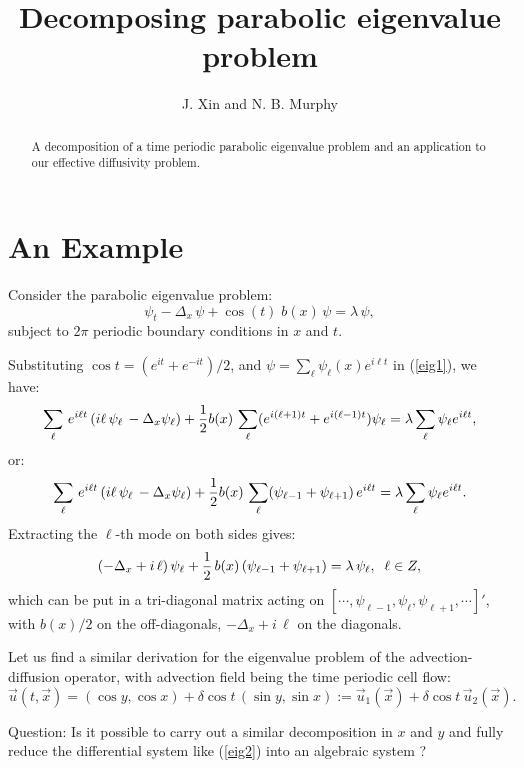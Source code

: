 \documentclass{article}
\newcommand{\no}{\nonumber}
\newcommand{\be}{\begin{equation}}
\newcommand{\ee}{\end{equation}}
\newcommand{\lam}{\mbox{$\lambda$}}
\newcommand{\0}{\mathbf{0}}
\newcommand{\1}{\mathbf{1}}
\newcommand{\2}{\mathbf{2}}
\newcommand{\3}{\mathbf{3}}
\newcommand{\4}{\mathbf{4}}
\newcommand{\5}{\mathbf{5}}
\newcommand{\6}{\mathbf{6}}
\newcommand{\7}{\mathbf{7}}
\newcommand{\8}{\mathbf{8}}
\begin{document}
\title{Decomposing parabolic eigenvalue problem}
\author{J. Xin and N. B. Murphy }
\date{}
\maketitle
\begin{abstract}
A decomposition of a time periodic parabolic eigenvalue problem and an
application to our effective diffusivity problem.

\end{abstract}
\bigskip
 
\section{An Example}
Consider the parabolic eigenvalue problem:
\be
\psi_t -\Delta_x \, \psi + \cos (t) \; b(x) \, \psi = \lam \, \psi, \label{eig1}
\ee
subject to $2\pi$ periodic boundary conditions in $x$ and $t$. 
\medskip

Substituting $\cos t = (e^{it} + e^{-it})/2$, and $\psi = \sum_{\ell} \psi_\ell (x) e^{i \ell t}$ in (\ref{eig1}), 
we have:
\be
\sum_\ell \,e^{i\ell t}\, (i \ell \, \psi_\ell\, - \Delta_x \psi_\ell) + {1\over 2} b(x)\, \sum_{\ell} (e^{i(\ell+1)t} + e^{i(\ell-1) t}) \psi_\ell 
= \lam \sum_\ell \psi_\ell e^{i\ell t}, \no
\ee
or:
\be
 \sum_\ell \,e^{i\ell t}\, (i \ell \, \psi_\ell\, - \Delta_x \psi_\ell)  + {1\over 2} b(x)\, \sum_{\ell} (\psi_{\ell-1} + \psi_{\ell+1}) \, e^{i\ell t} 
= \lam \sum_\ell \psi_\ell e^{i\ell t}. \no
\ee
Extracting the $\ell$-th mode on both sides gives:
\be
(-\Delta_x + i\, \ell)\, \psi_\ell +{1\over 2} \, b(x)\, (\psi_{\ell-1} + \psi_{\ell+1}) = \lam \, \psi_\ell, \;\; \ell \in Z, \label{eig2}
\ee
which can be put in a tri-diagonal matrix acting on $[\cdots, \psi_{\ell-1}, \psi_\ell, \psi_{\ell+1}, \cdots ]'$,
  with $b(x)/2$ on the off-diagonals, 
$-\Delta_x + i\, \ell $ on the diagonals.

Let us find a similar derivation for the eigenvalue problem of the 
advection-diffusion operator, with advection field being the time periodic cell flow:
\be \label{eig3}
\vec{u}(t,\vec{x})%
       =(\cos y,\cos x)+\delta\cos t \,(\sin y,\sin x)
       :=\vec{u}_1(\vec{x})+\delta\cos{t}\,\vec{u}_2(\vec{x}). 
\ee

Question: Is it possible to carry out a similar decomposition in $x$ and $y$ and fully reduce the 
differential system like (\ref{eig2}) into an algebraic system ?

%
\end{document}
